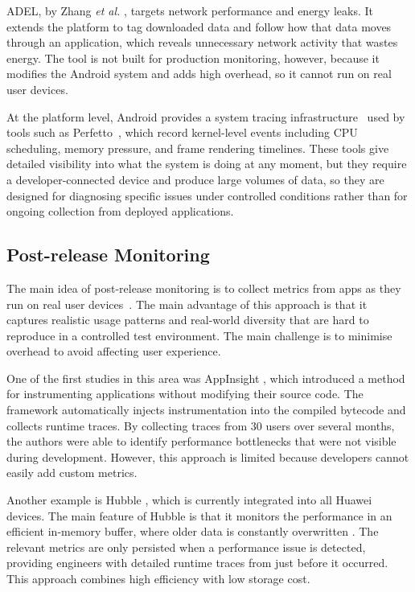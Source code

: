 ADEL, by Zhang \emph{et al.} \cite{ADEL}, targets network performance and energy leaks. It extends the platform to tag downloaded data and follow how that data moves through an application, which reveals unnecessary network activity that wastes energy. The tool is not built for production monitoring, however, because it modifies the Android system and adds high overhead, so it cannot run on real user devices.

At the platform level, Android provides a system tracing infrastructure~\cite{AndroidTracing} used by tools such as Perfetto~\cite{PerfettoDocs}, which record kernel-level events including CPU scheduling, memory pressure, and frame rendering timelines. These tools give detailed visibility into what the system is doing at any moment, but they require a developer-connected device and produce large volumes of data, so they are designed for diagnosing specific issues under controlled conditions rather than for ongoing collection from deployed applications.




\subsection{Post-release Monitoring}

The main idea of post-release monitoring is to collect metrics from apps as they run on real user devices~\cite{MonitoringAppPerformance}. The main
advantage of this approach is that it captures realistic usage patterns and real-world diversity that are hard to
reproduce in a controlled test environment. The main challenge is to minimise overhead to avoid affecting user experience.

One of the first studies in this area was AppInsight \cite{AppInsight}, which introduced a method for instrumenting
applications without modifying their source code. The framework automatically injects instrumentation into the compiled
bytecode and collects runtime traces. By collecting traces from 30 users over several months, the authors were able to
identify performance bottlenecks that were not visible during development. However, this approach is limited because
developers cannot easily add custom metrics.

Another example is Hubble \cite{Hubble}, which is currently integrated into all Huawei devices. The main feature of
Hubble is that it monitors the performance in an efficient in-memory buffer, where older data is constantly overwritten
\cite{Hubble}. The relevant metrics are only persisted when a performance issue is detected, providing engineers with
detailed runtime traces from just before it occurred. This approach combines high efficiency with low storage cost.

